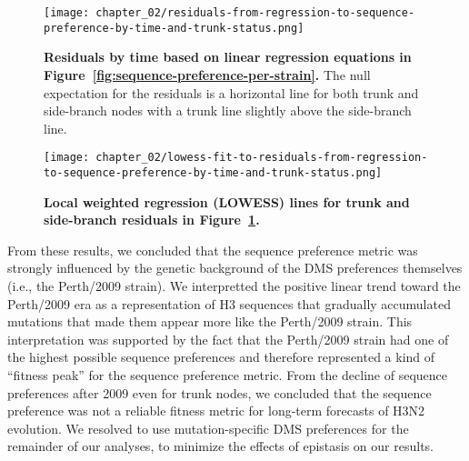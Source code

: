 \begin{figure}
  \centering
  \texttt{[image: chapter\_02/residuals-from-regression-to-sequence-preference-by-time-and-trunk-status.png]}
  \caption[{Residuals by time based on linear regression equations in Figure~\ref{fig:sequence-preference-per-strain}.}]{\label{fig:residuals-from-regression-fit-to-sequence-preference-per-strain} {\bf Residuals by time based on linear regression equations in Figure~\ref{fig:sequence-preference-per-strain}.}
    The null expectation for the residuals is a horizontal line for both trunk and side-branch nodes with a trunk line slightly above the side-branch line.}
\end{figure}

\begin{figure}
  \centering
  \texttt{[image: chapter\_02/lowess-fit-to-residuals-from-regression-to-sequence-preference-by-time-and-trunk-status.png]}
  \caption[{Local weighted regression (LOWESS) lines for trunk and side-branch residuals in Figure~\ref{fig:residuals-from-regression-fit-to-sequence-preference-per-strain}.}]{\label{fig:lowess-residuals-from-regression-fit-to-sequence-preference-per-strain} {\bf Local weighted regression (LOWESS) lines for trunk and side-branch residuals in Figure~\ref{fig:residuals-from-regression-fit-to-sequence-preference-per-strain}.}}
\end{figure}

From these results, we concluded that the sequence preference metric was strongly influenced by the genetic background of the DMS preferences themselves (i.e., the Perth/2009 strain).
We interpretted the positive linear trend toward the Perth/2009 era as a representation of H3 sequences that gradually accumulated mutations that made them appear more like the Perth/2009 strain.
This interpretation was supported by the fact that the Perth/2009 strain had one of the highest possible sequence preferences and therefore represented a kind of ``fitness peak'' for the sequence preference metric.
From the decline of sequence preferences after 2009 even for trunk nodes, we concluded that the sequence preference was not a reliable fitness metric for long-term forecasts of H3N2 evolution.
We resolved to use mutation-specific DMS preferences for the remainder of our analyses, to minimize the effects of epistasis on our results.
